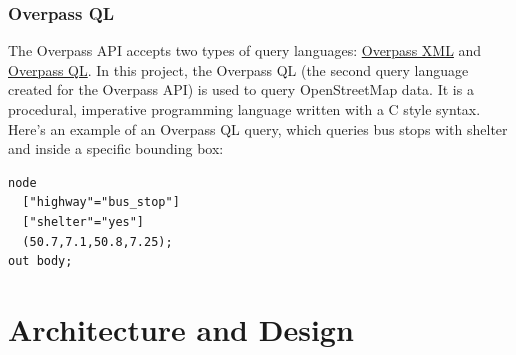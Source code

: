 \subsubsection{Overpass QL}
The Overpass API accepts two types of query languages: \href{https://wiki.openstreetmap.org/wiki/Overpass_API/Language_Guide#The_Overpass_API_languages}{Overpass XML}
and \href{https://wiki.openstreetmap.org/wiki/Overpass_API/Overpass_QL}{Overpass QL}.
In this project, the Overpass QL (the second query language created for the Overpass API) is used to query OpenStreetMap data.
It is a procedural, imperative programming language written with a C style syntax. \cite{WhatIsOverpassQL}\\
\newline
Here's an example of an Overpass QL query, which queries bus stops with shelter and inside a specific bounding box:\\
\begin{verbatim}
node
  ["highway"="bus_stop"]
  ["shelter"="yes"]
  (50.7,7.1,50.8,7.25);
out body;
\end{verbatim}
\section{Architecture and Design}
